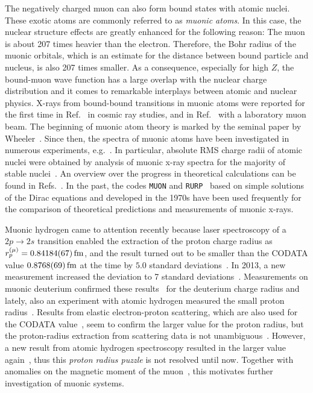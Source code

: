 The negatively charged muon can also form bound states with atomic nuclei. These exotic atoms are commonly referred to as \textit{muonic atoms}. In this case, the nuclear structure effects are greatly enhanced for the following reason: The muon is about 207 times heavier than the electron. Therefore, the Bohr radius of the muonic orbitals, which is an estimate for the distance between bound particle and nucleus, is also 207 times smaller. As a consequence, especially for high $Z$, the bound-muon wave function has a large overlap with the nuclear charge distribution and it comes to remarkable interplays between atomic and nuclear physics. X-rays from bound-bound transitions in muonic atoms were reported for the first time in Ref.~\cite{chang1949} in cosmic ray studies, and in Ref.~\cite{fitch1953} with a laboratory muon beam. The beginning of muonic atom theory is marked by the seminal paper by Wheeler~\cite{wheeler1949}.  Since then, the spectra of muonic atoms have been investigated in numerous experiments, e.g.~\cite{hitlin1970,zehnder1975,powers1976,Yamazaki1978,tanaka1983,tanaka1984,tanaka1984_2,Bergem1988,
powers1977}. In particular, absolute RMS charge radii of atomic nuclei were obtained by analysis of muonic x-ray spectra for the majority of stable nuclei~\cite{FRICKE1995}. An overview over the progress in theoretical calculations can be found in Refs.~\cite{BorieRinker1982,Devons1995,wu1969}. In the past, the codes \texttt{MUON} and \texttt{RURP}~\cite{rinker1979} based on simple solutions of the Dirac equations and developed in the 1970s have been used frequently for the comparison of theoretical predictions and measurements of muonic x-rays. 

Muonic hydrogen came to attention recently because laser spectroscopy of a \mbox{\small{$2p\rightarrow 2s$}} transition enabled the extraction of the proton charge radius as $r_p^{(\mu)}=0.84184(67)\,\rm{fm}$, and the result turned out to be smaller than the CODATA value $0.8768(69)\,\rm{fm}$ at the time by $5.0$ standard deviations~\cite{Pohl2010}. In 2013, a new measurement increased the deviation to 7 standard deviations~\cite{antognini2013}. Measurements on muonic deuterium confirmed these results~\cite{pohl2016} for the deuterium charge radius and lately, also an experiment with atomic hydrogen measured the small proton radius~\cite{beyer2017}.
Results from elastic electron-proton scattering, which are also used for the CODATA value~\cite{codata}, seem to confirm the larger value for the proton radius, but the proton-radius extraction from scattering data is not unambiguous~\cite{arrington2015}. However, a new result from atomic hydrogen spectroscopy resulted in the larger value again~\cite{fleurbaey2018}, thus this \textit{proton radius puzzle} is not resolved until now. Together with anomalies on the magnetic moment of the muon~\cite{bennett2006}, this motivates further investigation of muonic systems.

